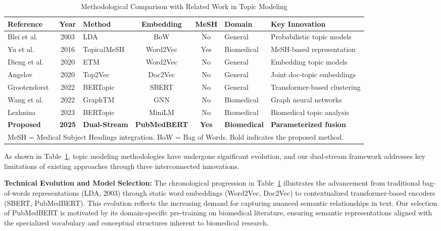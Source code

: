 \documentclass{ieeeaccess}
\begin{document}
\begin{table}[!t]
\centering
\caption{Methodological Comparison with Related Work in Topic Modeling}
\label{tab:comparison}
\renewcommand{\arraystretch}{1.3}
\begin{tabular}{lclccll}
\hline
\textbf{Reference} & \textbf{Year} & \textbf{Method} & \textbf{Embedding} & \textbf{MeSH} & \textbf{Domain} & \textbf{Key Innovation} \\
\hline
Blei et al.~\cite{blei_latent_2003} & 2003 & LDA & BoW & No & General & Probabilistic topic models \\
Yu et al.~\cite{yu_improving_2016} & 2016 & TopicalMeSH & Word2Vec & Yes & Biomedical & MeSH-based representation \\
Dieng et al.~\cite{dieng_topic_2020} & 2020 & ETM & Word2Vec & No & General & Embedding topic models \\
Angelov~\cite{angelov_top2vec_2020} & 2020 & Top2Vec & Doc2Vec & No & General & Joint doc-topic embeddings \\
Grootendorst~\cite{grootendorst_bertopic_2022} & 2022 & BERTopic & SBERT & No & General & Transformer-based clustering \\
Wang et al.~\cite{wang_graph-embedded_2022} & 2022 & GraphTM & GNN & No & Biomedical & Graph neural networks \\
Lezhnina~\cite{lezhnina_depression_2023} & 2023 & BERTopic & MiniLM & No & Biomedical & Biomedical topic analysis \\
\hline
\textbf{Proposed} & \textbf{2025} & \textbf{Dual-Stream} & \textbf{PubMedBERT} & \textbf{Yes} & \textbf{Biomedical} & \textbf{Parameterized fusion} \\
\hline
\multicolumn{7}{l}{\footnotesize MeSH = Medical Subject Headings integration. BoW = Bag of Words. Bold indicates the proposed method.} \\
\end{tabular}
\end{table}

As shown in Table~\ref{tab:comparison}, topic modeling methodologies have undergone significant evolution, and our dual-stream framework addresses key limitations of existing approaches through three interconnected innovations.

\textbf{Technical Evolution and Model Selection:} The chronological progression in Table~\ref{tab:comparison} illustrates the advancement from traditional bag-of-words representations (LDA, 2003) through static word embeddings (Word2Vec, Doc2Vec) to contextualized transformer-based encoders (SBERT, PubMedBERT). This evolution reflects the increasing demand for capturing nuanced semantic relationships in text. Our selection of PubMedBERT is motivated by its domain-specific pre-training on biomedical literature, ensuring semantic representations aligned with the specialized vocabulary and conceptual structures inherent to biomedical research.
\end{document}
